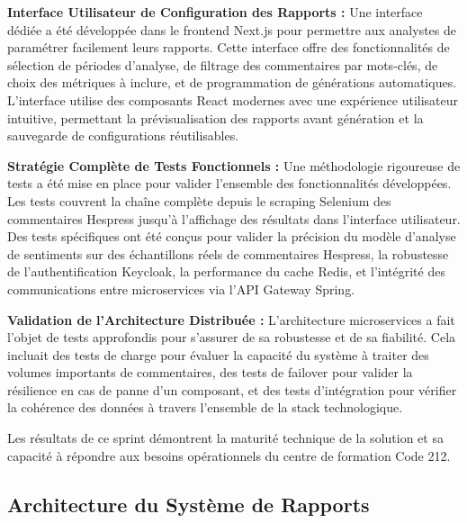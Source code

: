 \textbf{Interface Utilisateur de Configuration des Rapports :} Une interface dédiée a été développée dans le frontend Next.js pour permettre aux analystes de paramétrer facilement leurs rapports. Cette interface offre des fonctionnalités de sélection de périodes d'analyse, de filtrage des commentaires par mots-clés, de choix des métriques à inclure, et de programmation de générations automatiques. L'interface utilise des composants React modernes avec une expérience utilisateur intuitive, permettant la prévisualisation des rapports avant génération et la sauvegarde de configurations réutilisables.

\textbf{Stratégie Complète de Tests Fonctionnels :} Une méthodologie rigoureuse de tests a été mise en place pour valider l'ensemble des fonctionnalités développées. Les tests couvrent la chaîne complète depuis le scraping Selenium des commentaires Hespress jusqu'à l'affichage des résultats dans l'interface utilisateur. Des tests spécifiques ont été conçus pour valider la précision du modèle d'analyse de sentiments sur des échantillons réels de commentaires Hespress, la robustesse de l'authentification Keycloak, la performance du cache Redis, et l'intégrité des communications entre microservices via l'API Gateway Spring.

\textbf{Validation de l'Architecture Distribuée :} L'architecture microservices a fait l'objet de tests approfondis pour s'assurer de sa robustesse et de sa fiabilité. Cela incluait des tests de charge pour évaluer la capacité du système à traiter des volumes importants de commentaires, des tests de failover pour valider la résilience en cas de panne d'un composant, et des tests d'intégration pour vérifier la cohérence des données à travers l'ensemble de la stack technologique.

Les résultats de ce sprint démontrent la maturité technique de la solution et sa capacité à répondre aux besoins opérationnels du centre de formation Code 212.

\subsection{Architecture du Système de Rapports}

